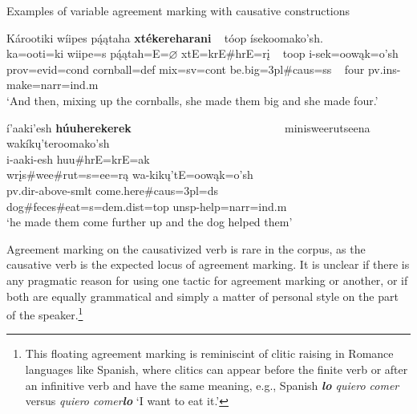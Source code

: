 \begin{exe}
    \item\label{Ch5CausativeAgree} Examples of variable agreement marking with causative constructions

    \begin{xlist}
        \item\label{Ch5CausativeAgreeA} \glll Károotiki wíipes pą́ątaha \textbf{xtékereharani} ~ tóop ísekoomako'sh.\\
        ka=ooti=ki wiipe=s pą́ątah=E=$\varnothing$ xtE=krE\#hrE=rį ~ toop i-sek=oowąk=o'sh\\
        prov=evid=cond \textnormal{cornball}=def \textnormal{mix}=sv=cont \textnormal{be.big}=3pl\#caus=ss ~ \textnormal{four} pv.ins-\textnormal{make}=narr=ind.m\\
        \glt `And then, mixing up the cornballs, she made them big and she made four.' \citep[268]{hollow1973b}

        \item\label{Ch5CausativeAgreeB} \glll í'aaki'esh \textbf{húuherekerek} ~ ~ ~ ~ ~ ~ ~ ~ ~ ~ ~ ~ ~ ~ ~ ~ minisweerutseena wakíkų'teroomako'sh\\
        i-aaki-esh huu\#hrE=krE=ak ~ ~ ~ ~ ~ ~ ~ ~ ~ ~ ~ ~ ~ ~ ~ ~ wrįs\#wee\#rut=s=ee=rą wa-kikų'tE=oowąk=o'sh\\
        pv.dir-\textnormal{above}-smlt \textnormal{come.here}\#caus=3pl=ds ~ ~ ~ ~ ~ ~ ~ ~ ~ ~ ~ ~ ~ ~ ~ ~ \textnormal{dog}\#\textnormal{feces}\#\textnormal{eat}=s=dem.dist=top unsp-\textnormal{help}=narr=ind.m\\
        \glt `he made them come further up and the dog helped them' \citep[181]{hollow1973a}
    
    \end{xlist}
\end{exe}

Agreement marking on the causativized verb is rare in the corpus, as the causative verb is the expected locus of agreement marking. It is unclear if there is any pragmatic reason for using one tactic for agreement marking or another, or if both are equally grammatical and simply a matter of personal style on the part of the speaker.\footnote{This floating agreement marking is reminiscint of clitic raising in Romance languages like Spanish, where clitics can appear before the finite verb or after an infinitive verb and have the same meaning, e.g., Spanish \textit{\textbf{lo} quiero comer} versus \textit{quiero comer\textbf{lo}} `I want to eat it.'}

